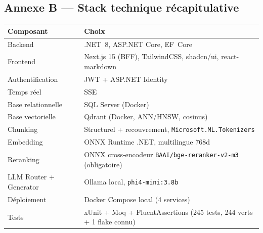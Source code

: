 \documentclass[12pt,a4paper]{article}
\newcommand{\code}[1]{\texttt{\small #1}}
\begin{document}
\subsection*{Annexe B --- Stack technique r\'ecapitulative}
\begin{center}\small
\begin{tabularx}{\textwidth}{@{}l X@{}}
\toprule
\textbf{Composant} & \textbf{Choix} \\
\midrule
Backend & .NET~8, ASP.NET Core, EF~Core \\
Frontend & Next.js 15 (BFF), TailwindCSS, shadcn/ui, react-markdown \\
Authentification & JWT + ASP.NET Identity \\
Temps r\'eel & SSE \\
Base relationnelle & SQL Server (Docker) \\
Base vectorielle & Qdrant (Docker, ANN/HNSW, cosinus) \\
Chunking & Structurel + recouvrement, \code{Microsoft.ML.Tokenizers} \\
Embedding & ONNX Runtime .NET, multilingue 768d \\
Reranking & ONNX cross-encodeur \code{BAAI/bge-reranker-v2-m3} (obligatoire) \\
LLM Router + Generator & Ollama local, \code{phi4-mini:3.8b} \\
D\'eploiement & Docker Compose local (4 services) \\
Tests & xUnit + Moq + FluentAssertions (245 tests, 244 verts + 1 flake connu) \\
\bottomrule
\end{tabularx}
\end{center}
\end{document}
